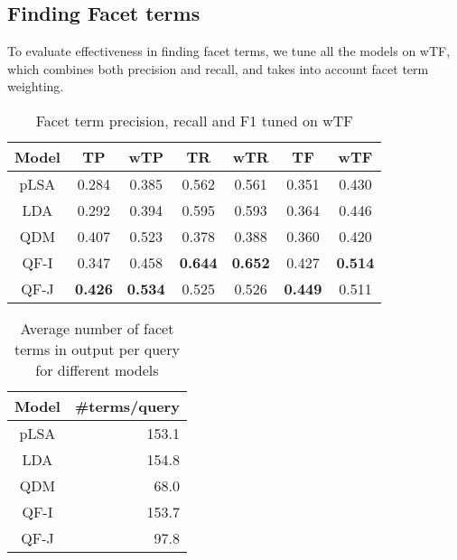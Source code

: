 \subsection{Finding Facet terms}
\label{sec:expt}
To evaluate effectiveness in finding facet terms, we tune all the models on wTF, which combines both precision and recall, and takes into account facet term weighting.
\begin{table}[ht!]
\centering
\caption{Facet term precision, recall and F1 tuned on wTF}
\label{tab:evalclass}
\begin{tabular}{|c|c|c|c|c|c|c|} \hline
Model & TP & wTP & TR & wTR & TF & wTF\\  \hline
pLSA & 0.284 & 0.385 & 0.562 & 0.561 & 0.351 & 0.430\\
LDA & 0.292 & 0.394 & 0.595 & 0.593 & 0.364 & 0.446\\
QDM & 0.407 & 0.523 & 0.378 & 0.388 & 0.360 & 0.420\\
QF-I & 0.347 & 0.458 & \textbf{0.644} & \textbf{0.652} & 0.427 & \textbf{0.514}\\
QF-J & \textbf{0.426} & \textbf{0.534} & 0.525 & 0.526 & \textbf{0.449} & 0.511\\ \hline
\end{tabular}
\end{table}

\begin{table}[ht!]
\centering
\caption{Average number of facet terms in output per query for different models}
\label{tab:numterms}
\begin{tabular}{|c|r|} \hline
Model & \#terms/query\\  \hline
pLSA & 153.1 \\
LDA & 154.8 \\
QDM & 68.0 \\
QF-I & 153.7 \\
QF-J & 97.8\\ \hline
\end{tabular}
\end{table}

